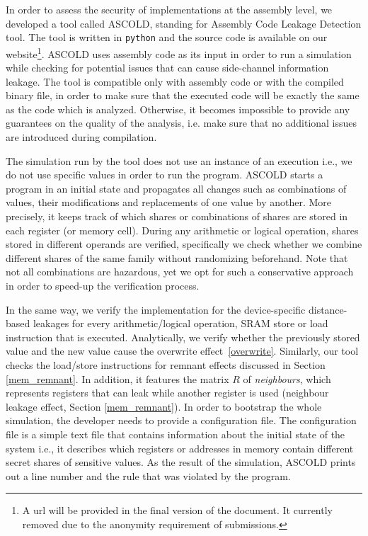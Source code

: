 In order to assess the security of implementations at the assembly level, we developed a tool called ASCOLD, standing for Assembly Code Leakage Detection tool.
The tool is written in \texttt{python} and the source code is available on our 
website\footnote{A url will be provided in the final version of the document. 
It currently removed due to the anonymity requirement of submissions.}.
ASCOLD uses assembly code as its input in order to run a simulation while checking for potential
issues that can cause side-channel information leakage.
The tool is compatible only with assembly code or with the compiled binary file, 
in order to make sure that the executed code will be exactly the same as the code
which is analyzed. Otherwise, it becomes impossible to provide any guarantees
on the quality of the analysis, i.e. make sure that no additional issues are introduced during compilation.

The simulation run by the tool does not use an instance of an execution i.e.,
we do not use specific values in order to run the program.
ASCOLD starts a program in an initial state and propagates all changes
such as combinations of values, their modifications and replacements
of one value by another. More precisely, it keeps track of which shares
or combinations of shares are stored in each register (or memory cell).
During any arithmetic or logical operation, shares stored in different operands
are verified, specifically we check whether we combine different shares of the same family without randomizing beforehand. Note that not all combinations are hazardous, yet we opt for such a conservative approach in order to speed-up the verification process.

In the same way, we verify the implementation for the device-specific distance-based leakages 
for every arithmetic/logical operation, SRAM store or load instruction that is executed. Analytically, we verify whether
the previously stored value and the new value cause the overwrite effect~\ref{overwrite}. Similarly, our tool checks the load/store instructions for remnant effects discussed in Section \ref{mem_remnant}. In addition, it features the matrix $R$ of \emph{neighbours}, which represents registers that can leak while another register is used (neighbour leakage effect, Section \ref{mem_remnant}).
In order to bootstrap the whole simulation, the developer needs to provide
a configuration file. The configuration file is a simple text file that contains information about the initial
state of the system i.e., it describes which registers or addresses in memory contain different secret shares of sensitive values.
As the result of the simulation, ASCOLD prints out a line number and the rule that was violated
by the program.

